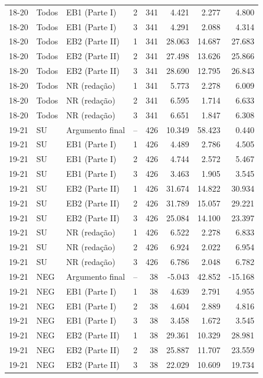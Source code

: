 \begin{longtable}{lllcrrrr}
18-20 & Todos & EB1 (Parte I) & 2 & 341 & 4.421 & 2.277 & 4.800 \\
18-20 & Todos & EB1 (Parte I) & 3 & 341 & 4.291 & 2.088 & 4.314 \\
18-20 & Todos & EB2 (Parte II) & 1 & 341 & 28.063 & 14.687 & 27.683 \\
18-20 & Todos & EB2 (Parte II) & 2 & 341 & 27.498 & 13.626 & 25.866 \\
18-20 & Todos & EB2 (Parte II) & 3 & 341 & 28.690 & 12.795 & 26.843 \\
18-20 & Todos & NR (redação) & 1 & 341 & 5.773 & 2.278 & 6.009 \\
18-20 & Todos & NR (redação) & 2 & 341 & 6.595 & 1.714 & 6.633 \\
18-20 & Todos & NR (redação) & 3 & 341 & 6.651 & 1.847 & 6.308 \\
\midrule
19-21 & SU & Argumento final & -- & 426 & 10.349 & 58.423 & 0.440 \\
19-21 & SU & EB1 (Parte I) & 1 & 426 & 4.489 & 2.786 & 4.505 \\
19-21 & SU & EB1 (Parte I) & 2 & 426 & 4.744 & 2.572 & 5.467 \\
19-21 & SU & EB1 (Parte I) & 3 & 426 & 3.463 & 1.905 & 3.545 \\
19-21 & SU & EB2 (Parte II) & 1 & 426 & 31.674 & 14.822 & 30.934 \\
19-21 & SU & EB2 (Parte II) & 2 & 426 & 31.789 & 15.057 & 29.221 \\
19-21 & SU & EB2 (Parte II) & 3 & 426 & 25.084 & 14.100 & 23.397 \\
19-21 & SU & NR (redação) & 1 & 426 & 6.522 & 2.278 & 6.833 \\
19-21 & SU & NR (redação) & 2 & 426 & 6.924 & 2.022 & 6.954 \\
19-21 & SU & NR (redação) & 3 & 426 & 6.786 & 2.048 & 6.782 \\
19-21 & NEG & Argumento final & -- & 38 & -5.043 & 42.852 & -15.168 \\
19-21 & NEG & EB1 (Parte I) & 1 & 38 & 4.639 & 2.791 & 4.955 \\
19-21 & NEG & EB1 (Parte I) & 2 & 38 & 4.604 & 2.889 & 4.816 \\
19-21 & NEG & EB1 (Parte I) & 3 & 38 & 3.458 & 1.672 & 3.545 \\
19-21 & NEG & EB2 (Parte II) & 1 & 38 & 29.361 & 10.329 & 28.981 \\
19-21 & NEG & EB2 (Parte II) & 2 & 38 & 25.887 & 11.707 & 23.559 \\
19-21 & NEG & EB2 (Parte II) & 3 & 38 & 22.029 & 10.609 & 19.734 \\

\end{longtable}
